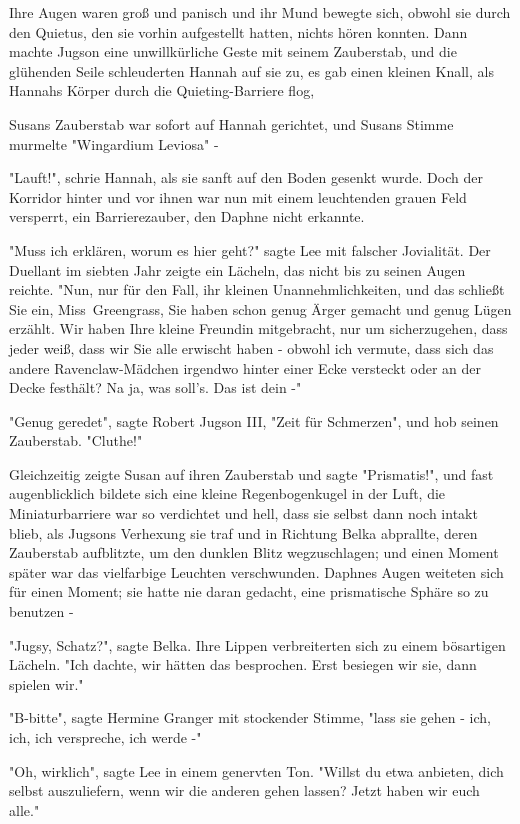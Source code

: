 {Ihre Augen waren groß und panisch und ihr Mund bewegte sich, obwohl sie durch den Quietus, den sie vorhin aufgestellt hatten, nichts hören konnten. Dann machte Jugson eine unwillkürliche Geste mit seinem Zauberstab, und die glühenden Seile schleuderten Hannah auf sie zu, es gab einen kleinen Knall, als Hannahs Körper durch die Quieting-Barriere flog,

Susans Zauberstab war sofort auf Hannah gerichtet, und Susans Stimme murmelte "Wingardium Leviosa" -

"Lauft!", schrie Hannah, als sie sanft auf den Boden gesenkt wurde. Doch der Korridor hinter und vor ihnen war nun mit einem leuchtenden grauen Feld versperrt, ein Barrierezauber, den Daphne nicht erkannte.

"Muss ich erklären, worum es hier geht?" sagte Lee mit falscher Jovialität. Der Duellant im siebten Jahr zeigte ein Lächeln, das nicht bis zu seinen Augen reichte. "Nun, nur für den Fall, ihr kleinen Unannehmlichkeiten, und das schließt Sie ein, Miss~Greengrass, Sie haben schon genug Ärger gemacht und genug Lügen erzählt. Wir haben Ihre kleine Freundin mitgebracht, nur um sicherzugehen, dass jeder weiß, dass wir Sie alle erwischt haben - obwohl ich vermute, dass sich das andere Ravenclaw-Mädchen irgendwo hinter einer Ecke versteckt oder an der Decke festhält? Na ja, was soll's. Das ist dein -"

"Genug geredet", sagte Robert Jugson III, "Zeit für Schmerzen", und hob seinen Zauberstab. "Cluthe!"

Gleichzeitig zeigte Susan auf ihren Zauberstab und sagte "Prismatis!", und fast augenblicklich bildete sich eine kleine Regenbogenkugel in der Luft, die Miniaturbarriere war so verdichtet und hell, dass sie selbst dann noch intakt blieb, als Jugsons Verhexung sie traf und in Richtung Belka abprallte, deren Zauberstab aufblitzte, um den dunklen Blitz wegzuschlagen; und einen Moment später war das vielfarbige Leuchten verschwunden. Daphnes Augen weiteten sich für einen Moment; sie hatte nie daran gedacht, eine prismatische Sphäre so zu benutzen -

"Jugsy, Schatz?", sagte Belka. Ihre Lippen verbreiterten sich zu einem bösartigen Lächeln. "Ich dachte, wir hätten das besprochen. Erst besiegen wir sie, dann spielen wir."

"B-bitte", sagte Hermine Granger mit stockender Stimme, "lass sie gehen - ich, ich, ich verspreche, ich werde -"

"Oh, wirklich", sagte Lee in einem genervten Ton. "Willst du etwa anbieten, dich selbst auszuliefern, wenn wir die anderen gehen lassen? Jetzt haben wir euch alle."

}
